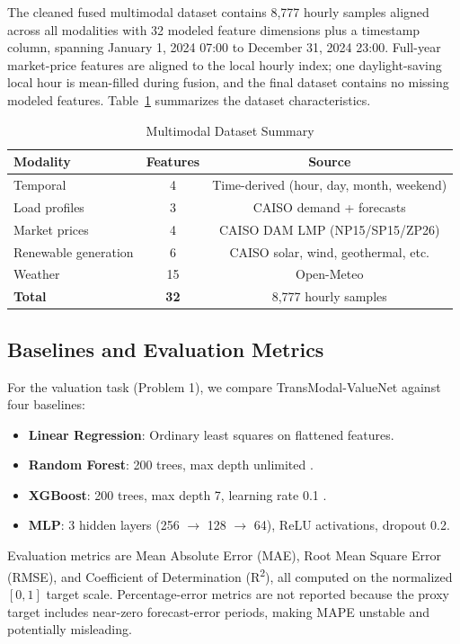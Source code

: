 \documentclass{ieeeaccess}
\begin{document}
The cleaned fused multimodal dataset contains 8,777 hourly samples aligned across all modalities with 32 modeled feature dimensions plus a timestamp column, spanning January 1, 2024 07:00 to December 31, 2024 23:00. Full-year market-price features are aligned to the local hourly index; one daylight-saving local hour is mean-filled during fusion, and the final dataset contains no missing modeled features. Table~\ref{tab:dataset_summary} summarizes the dataset characteristics.

\begin{table}[t!]
  \caption{Multimodal Dataset Summary}
  \label{tab:dataset_summary}
  \centering
  \begin{tabular}{lcc}
  \toprule
  \textbf{Modality} & \textbf{Features} & \textbf{Source} \\
  \midrule
  Temporal & 4 & Time-derived (hour, day, month, weekend) \\
  Load profiles & 3 & CAISO demand + forecasts \\
  Market prices & 4 & CAISO DAM LMP (NP15/SP15/ZP26) \\
  Renewable generation & 6 & CAISO solar, wind, geothermal, etc. \\
  Weather & 15 & Open-Meteo \\
  \midrule
  \textbf{Total} & \textbf{32} & 8,777 hourly samples \\
  \bottomrule
  \end{tabular}
\end{table}

\subsection{Baselines and Evaluation Metrics}

For the valuation task (Problem 1), we compare TransModal-ValueNet against four baselines:
\begin{itemize}
  \item \textbf{Linear Regression}: Ordinary least squares on flattened features.
  \item \textbf{Random Forest}: 200 trees, max depth unlimited \cite{b27}.
  \item \textbf{XGBoost}: 200 trees, max depth 7, learning rate 0.1 \cite{b26}.
  \item \textbf{MLP}: 3 hidden layers (256 $\rightarrow$ 128 $\rightarrow$ 64), ReLU activations, dropout 0.2.
\end{itemize}

Evaluation metrics are Mean Absolute Error (MAE), Root Mean Square Error (RMSE), and Coefficient of Determination (R\textsuperscript{2}), all computed on the normalized $[0, 1]$ target scale. Percentage-error metrics are not reported because the proxy target includes near-zero forecast-error periods, making MAPE unstable and potentially misleading.
\end{document}
